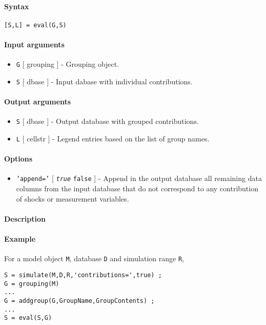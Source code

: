 


	\paragraph{Syntax}\label{syntax}

\begin{verbatim}
[S,L] = eval(G,S)
\end{verbatim}

\paragraph{Input arguments}\label{input-arguments}

\begin{itemize}
\item
  \texttt{G} {[} grouping {]} - Grouping object.
\item
  \texttt{S} {[} dbase {]} - Input dabase with individual contributions.
\end{itemize}

\paragraph{Output arguments}\label{output-arguments}

\begin{itemize}
\item
  \texttt{S} {[} dbase {]} - Output database with grouped contributions.
\item
  \texttt{L} {[} cellstr {]} - Legend entries based on the list of group
  names.
\end{itemize}

\paragraph{Options}\label{options}

\begin{itemize}
\itemsep1pt\parskip0pt
\item
  \texttt{'append='} {[} \emph{\texttt{true}} \textbar{} \texttt{false}
  {]} - Append in the output database all remaining data columns from
  the input database that do not correspond to any contribution of
  shocks or measurement variables.
\end{itemize}

\paragraph{Description}\label{description}

\paragraph{Example}\label{example}

For a model object \texttt{M}, database \texttt{D} and simulation range
\texttt{R},

\begin{verbatim}
S = simulate(M,D,R,'contributions=',true) ;
G = grouping(M)
...
G = addgroup(G,GroupName,GroupContents) ;
...
S = eval(S,G)
\end{verbatim}


